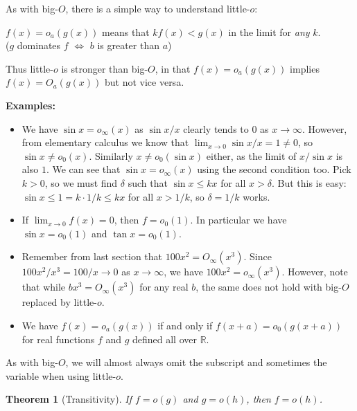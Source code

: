 \documentclass{article}
\newtheorem{theorem}{Theorem}
\theoremstyle{definition}
\newcommand\RR{\mathbb R}
\begin{document}
As with big-$O$, there is a simple way to understand little-$o$:
\begin{center}
    \(f(x) = o_a(g(x))\) means that \(kf(x) < g(x)\) in the limit for \textit{any} \(k\). \\
    (\(g\) dominates \(f\) \(\iff\) \(b\) is greater than \(a\))
\end{center}
Thus little-$o$ is stronger than big-$O$, in that \(f(x) = o_a(g(x))\) implies \(f(x) = O_a(g(x))\) but not vice versa.

\textbf{Examples:}

\begin{itemize}
    \item We have \(\sin x = o_{\infty}(x)\) as \(\sin x / x\) clearly tends to \(0\) as \(x\to\infty\).
        However, from elementary calculus we know that \(\lim_{x\to 0} \sin x/x = 1 \ne 0\), so \(\sin x \ne o_0(x)\).
        Similarly \(x \ne o_0(\sin x)\) either, as the limit of \(x/\sin x\) is also \(1\).
        We can see that \(\sin x = o_{\infty}(x)\) using the second condition too.
        Pick \(k > 0\), so we must find \(\delta\) such that \(\sin x \le kx\) for all \(x>\delta\).
        But this is easy: \(\sin x \le 1 = k \cdot 1/k \le kx\) for all \(x>1/k\), so \(\delta = 1/k\) works.

    \item If \(\lim_{x\to 0} f(x) = 0\), then \(f = o_0(1)\).
        In particular we have \(\sin x = o_0(1)\) and \(\tan x = o_0(1)\).

    \item Remember from last section that \(100x^2 = O_{\infty}(x^3)\).
        Since \(100x^2/x^3 = 100/x \to 0\) as \(x\to\infty\), we have \(100x^2 = o_{\infty}(x^3)\).
        However, note that while \(bx^3 = O_{\infty}(x^3)\) for any real \(b\), the same does not hold with big-$O$ replaced by little-$o$.

    \item We have \(f(x) = o_a(g(x))\) if and only if \(f(x+a) = o_0(g(x+a))\) for real functions \(f\) and \(g\) defined all over \(\RR\).

\end{itemize}

As with big-$O$, we will almost always omit the subscript and sometimes the variable when using little-$o$.

\begin{theorem}[Transitivity]
    If \(f = o(g)\) and \(g = o(h)\), then \(f = o(h)\).
\end{theorem}
\end{document}
